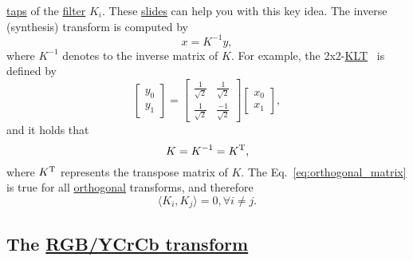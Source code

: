 \href{https://en.wikipedia.org/wiki/Finite_impulse_response}{taps} of
the \href{https://en.wikipedia.org/wiki/Digital_filter}{filter}
$K_i$. These
\href{https://cseweb.ucsd.edu/classes/fa17/cse166-a/lec13.pdf}{slides}
can help you with this key idea. The inverse (synthesis) transform is
computed by
\begin{equation}
  x = K^{-1}y,
  \label{eq:backward_transform_matrix_form}
\end{equation}
where $K^{-1}$ denotes to the inverse matrix of $K$. For example, the
2x2-\href{https://en.wikipedia.org/wiki/Karhunen-Loeve_theorem}{KLT}~\cite{sayood2017introduction}
is defined by
\begin{equation}
  \begin{bmatrix}
    y_0 \\
    y_1
  \end{bmatrix}
  = 
  \begin{bmatrix} \frac{1}{\sqrt{2}} & \frac{1}{\sqrt{2}} \\ \frac{1}{\sqrt{2}} & \frac{-1}{\sqrt{2}} \end{bmatrix}
  \begin{bmatrix}
    x_0 \\
    x_1
  \end{bmatrix},
  \label{eq:KLT_transform}
\end{equation}
and it holds that
\begin{equation}
  K=K^{-1}=K^{\text T},
  \label{eq:orthogonal_matrix}
\end{equation}
where $K^{\text T}$ represents the transpose matrix of $K$. The
Eq.~\ref{eq:orthogonal_matrix} is true for all
\href{https://en.wikipedia.org/wiki/Orthogonality}{orthogonal}
transforms, and therefore
\begin{equation}
  \langle K_i, K_j\rangle = 0, \forall i\neq j.
\end{equation}

\subsection{The \href{https://en.wikipedia.org/wiki/YCbCr}{RGB/YCrCb transform}}
